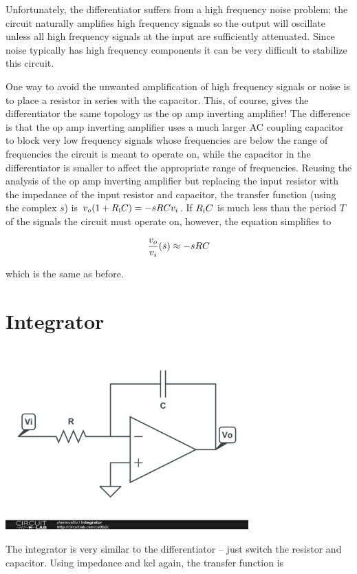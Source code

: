 Unfortunately, the differentiator suffers from a high frequency noise problem; the circuit naturally amplifies high frequency signals so the output will oscillate unless all high frequency signals at the input are sufficiently attenuated.
Since noise typically has high frequency components it can be very difficult to stabilize this circuit.

One way to avoid the unwanted amplification of high frequency signals or noise is to place a resistor in series with the capacitor.
This, of course, gives the differentiator the same topology as the op amp inverting amplifier!
The difference is that the op amp inverting amplifier uses a much larger AC coupling capacitor to block very low frequency signals whose frequencies are below the range of frequencies the circuit is meant to operate on, while the capacitor in the differentiator is smaller to affect the appropriate range of frequencies.
Reusing the analysis of the op amp inverting amplifier but replacing the input resistor with the impedance of the input resistor and capacitor, the transfer function (using the complex $s$) is $\vout(1+R\sub{i}C) = -sRC\vin$. If $R_\mathrm{i} C$ is much less than the period $T$ of the signals the circuit must operate on, however, the equation simplifies to

\textcolor{red}{
\begin{equation}
\frac{\vout}{\vin}(s) \approx -sRC
\label{eq:differentiator_series_cap}
\end{equation}
}

which is the same as before. \autocite[79-80]{op-amp-circuits-johnson}

\section{Integrator}
\begin{center}
	\includegraphics[width=0.70\textwidth]{schematics/integrator.PNG}
\end{center}
The integrator is very similar to the differentiator -- just switch the resistor and capacitor. Using impedance and \ac{kcl} again, the transfer function is

